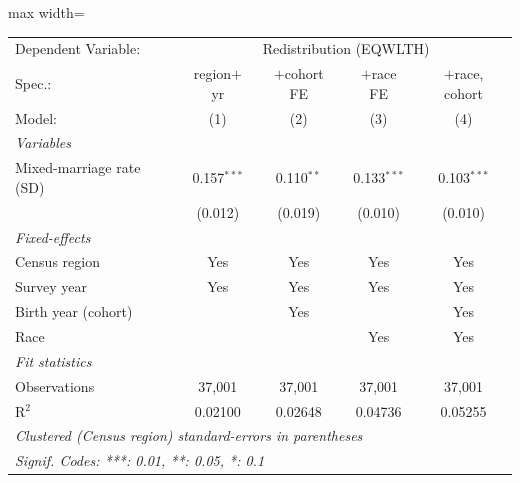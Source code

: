       \begin{adjustbox}{max width=\linewidth}
   \begin{tabular}{lcccc}
      \tabularnewline \midrule \midrule
      Dependent Variable: & \multicolumn{4}{c}{Redistribution (EQWLTH)}\\
      Spec.:                   & region$+$yr   & $+$cohort FE & $+$race FE    & $+$race, cohort \\   
      Model:                   & (1)           & (2)          & (3)           & (4)\\  
      \midrule
      \emph{Variables}\\
      Mixed-marriage rate (SD) & 0.157$^{***}$ & 0.110$^{**}$ & 0.133$^{***}$ & 0.103$^{***}$\\   
                               & (0.012)       & (0.019)      & (0.010)       & (0.010)\\   
      \midrule
      \emph{Fixed-effects}\\
      Census region            & Yes           & Yes          & Yes           & Yes\\  
      Survey year              & Yes           & Yes          & Yes           & Yes\\  
      Birth year (cohort)      &               & Yes          &               & Yes\\  
      Race                     &               &              & Yes           & Yes\\  
      \midrule
      \emph{Fit statistics}\\
      Observations             & 37,001        & 37,001       & 37,001        & 37,001\\  
      R$^2$                    & 0.02100       & 0.02648      & 0.04736       & 0.05255\\  
      \midrule \midrule
      \multicolumn{5}{l}{\emph{Clustered (Census region) standard-errors in parentheses}}\\
      \multicolumn{5}{l}{\emph{Signif. Codes: ***: 0.01, **: 0.05, *: 0.1}}\\
   \end{tabular}
      \end{adjustbox}
\vspace{3pt}\par{}
